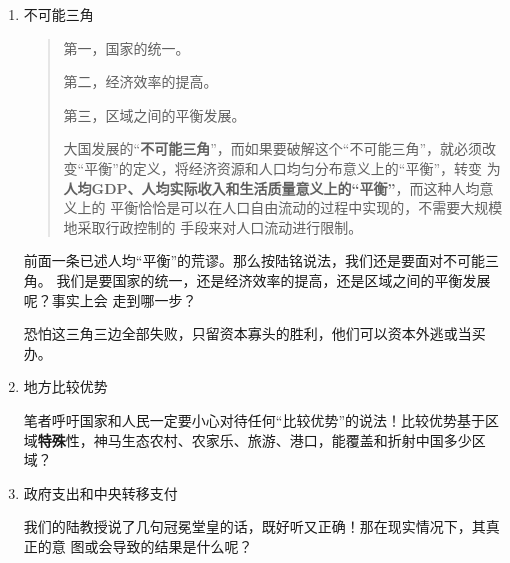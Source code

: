 \begin{enumerate}
也可以参考美国经济创新集团（The Economic Innovation Group）发布的困境社区指数
（DCI，the Distressed Communities Index，见\cref{fig:DCIbyD}）\footnote{对困境社区指
  数DCI的中文介绍可见澎湃 《美国社区评价：困境社区指数和繁荣城区体系》。}。

  \begin{quotation}
  但是，城市化和地区之间的自由移民是一个\textbf{几十年甚至上百年的过程}，在这个过程
  中，如果我们只看\textbf{特定时段的局部地区}，就可能会觉得，劳动力流动并没有带来地区
  间收入水平差距的缩小。
  \end{quotation}
  陆铭倒是知道这是即使均衡，也需长期。可在几十年甚至上百年的区域失衡中，中国
  中央和地方、地方和地方、政府和人民的矛盾恐怕早已内爆了。

\item 不可能三角

  \begin{quotation}

    第一，国家的统一。

    第二，经济效率的提高。

    第三，区域之间的平衡发展。

    大国发展的“\textbf{不可能三角}”，而如果要破解这个“不可能三角”，就必须改
    变“平衡”的定义，将经济资源和人口均匀分布意义上的“平衡”，转变
    为\textbf{人均GDP、人均实际收入和生活质量意义上的“平衡”}，而这种人均意义上的
    平衡恰恰是可以在人口自由流动的过程中实现的，不需要大规模地采取行政控制的
    手段来对人口流动进行限制。
  \end{quotation}

  前面一条已述人均“平衡”的荒谬。那么按陆铭说法，我们还是要面对不可能三角。
  我们是要国家的统一，还是经济效率的提高，还是区域之间的平衡发展呢？事实上会
  走到哪一步？

  恐怕这三角三边全部失败，只留资本寡头的胜利，他们可以资本外逃或当买办。

\item 地方比较优势

  笔者呼吁国家和人民一定要小心对待任何“比较优势”的说法！比较优势基于区
  域\textbf{特殊}性，神马生态农村、农家乐、旅游、港口，能覆盖和折射中国多少区域？


\item 政府支出和中央转移支付

  我们的陆教授说了几句冠冕堂皇的话，既好听又正确！那在现实情况下，其真正的意
  图或会导致的结果是什么呢？



\end{enumerate}
